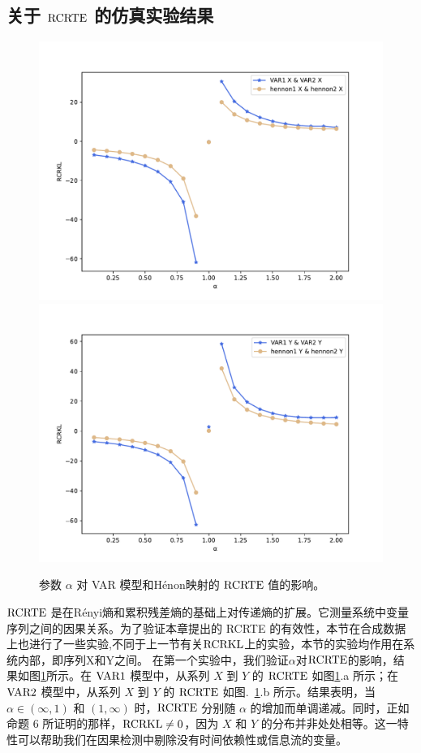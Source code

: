 \subsection{关于 $\rm{RCRTE}$ 的仿真实验结果}


\begin{figure}[htbp]
\begin{center}
\includegraphics[scale=0.35]{./ch2/fig2_1.pdf}\label{a}
\includegraphics[scale=0.35]{./ch2/fig2_2.pdf}\label{b}
\caption{参数 $\alpha$ 对  VAR 模型和H\'{e}non映射的 $\rm{RCRTE}$ 值的影响。} \label{fig3}
\end{center}
\end{figure}\label{x_x_var}


$\rm{RCRTE}$ 是在R\'{e}nyi熵和累积残差熵的基础上对传递熵的扩展。它测量系统中变量序列之间的因果关系。为了验证本章提出的 RCRTE 的有效性，本节在合成数据上也进行了一些实验,不同于上一节有关$\rm{RCRKL}$上的实验，本节的实验均作用在系统内部，即序列X和Y之间。 在第一个实验中，我们验证$\alpha$对$\rm{RCRTE}$的影响，结果如图\ref{fig3}所示。在 $\rm{VAR1}$ 模型中，从系列 $X$ 到 $Y$ 的 $\rm{RCRTE}$ 如图\ref{fig3}.a 所示；在 $\rm{VAR2}$ 模型中，从系列 $X$ 到 $Y$ 的 $\rm{RCRTE}$ 如图.~\ref{fig3}.b 所示。结果表明，当 $\alpha \in (\infty, 1)$ 和 $(1,\infty)$ 时，$\rm{RCRTE}$ 分别随 $\alpha$ 的增加而单调递减。同时，正如命题 6 所证明的那样，$\rm{RCRKL}\neq 0$，因为 $X$ 和 $Y$ 的分布并非处处相等。这一特性可以帮助我们在因果检测中剔除没有时间依赖性或信息流的变量。


